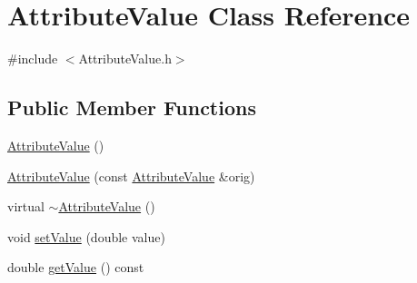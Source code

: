 \hypertarget{class_attribute_value}{\section{Attribute\-Value Class Reference}
\label{class_attribute_value}
}


{\ttfamily \#include $<$Attribute\-Value.\-h$>$}

\subsection*{Public Member Functions}
\begin{DoxyCompactItemize}
\item 
\hyperlink{class_attribute_value_a85fc10d30887464438324f511e415e04}{Attribute\-Value} ()
\item 
\hyperlink{class_attribute_value_a5992624b7267bf5e140edeee7181e79d}{Attribute\-Value} (const \hyperlink{class_attribute_value}{Attribute\-Value} \&orig)
\item 
virtual \hyperlink{class_attribute_value_a9d006ff00e58352efcdbc7c86b16a6df}{$\sim$\-Attribute\-Value} ()
\item 
void \hyperlink{class_attribute_value_a2289ac6979d8f6c1dfb1b3998f6f3665}{set\-Value} (double value)
\item 
double \hyperlink{class_attribute_value_a3516a35dd1c503eb73d73082c5c4d36c}{get\-Value} () const 
\end{DoxyCompactItemize}


